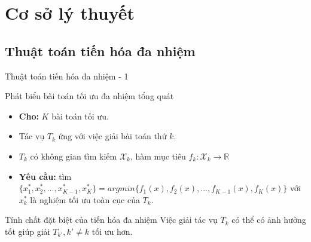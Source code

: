\section{Cơ sở lý thuyết}

\subsection{Thuật toán tiến hóa đa nhiệm}

\begin{frame}{Thuật toán tiến hóa đa nhiệm - 1}
    \begin{alertblock}{Phát biểu bài toán tối ưu đa nhiệm tổng quát}
        \begin{itemize}
            \item \textbf{Cho:} $K$ bài toán tối ưu.
            \item Tác vụ $T_k$ ứng với việc giải bài toán thứ $k$.
            \item $T_k$ có không gian tìm kiếm $\mathcal{X}_k$, hàm mục tiêu $f_k:\mathcal{X}_k \rightarrow \mathbb{R}$
            \item \textbf{Yêu cầu:} tìm $\{x^*_1, x^*_2, \ldots, x^*_{K-1}, x^*_K\}=argmin\{f_1(x), f_2(x), \ldots, f_{K-1}(x), f_K(x)\}$ với $x^*_k$ là nghiệm tối ưu toàn cục của $T_k$.
        \end{itemize}
    \end{alertblock}
    \begin{block}{Tính chất đặt biệt của tiến hóa đa nhiệm}
        Việc giải tác vụ $T_k$ có thể có ảnh hưởng tốt giúp giải $T_{k'}, k' \ne k$ tối ưu hơn.
    \end{block}
\end{frame}

